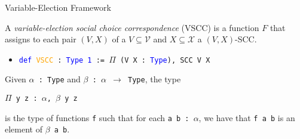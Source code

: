 \documentclass[12pt,xcolor=svgnames,blue,aspectratio=169]{beamer}
\begin{document}
\begin{frame}{Variable-Election Framework}

\begin{definition}\label{VSCC} A \textit{variable-election social choice correspondence} (VSCC) is a function $F$ that assigns to each pair $(V,X)$ of a $V\subseteq \mathcal{V}$ and $X\subseteq\mathcal{X}$ a $(V,X)$-SCC. %
\end{definition}


\pause
\begin{itemize}
\item[] \texttt{\textcolor{blue}{def} \textcolor{orange}{VSCC} : \textcolor{blue}{Type 1} := $\Pi$ (V X : \textcolor{blue}{Type}), SCC V X}
\end{itemize}

\vspace{.25in}


Given \texttt{$\alpha$~:~Type} and \texttt{$\beta$~:~$\alpha$ $\to$ Type}, the type 
\begin{center}\texttt{$\Pi$ y z~:~$\alpha$, $\beta$ y z}\end{center} is the type of functions \texttt{f} such that for each \texttt{a b~:~$\alpha$}, we have that \texttt{f a b} is an element of \texttt{$\beta$~a~b}. %


 


\end{frame}
\end{document}
